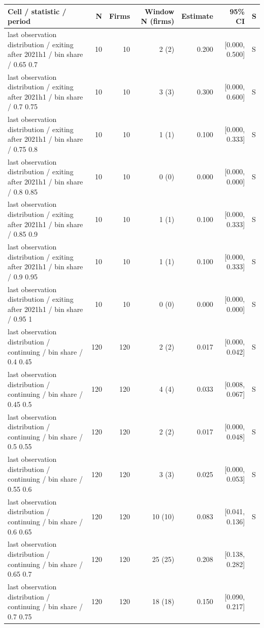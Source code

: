 \begin{threeparttable}
\begin{tabular}{p{5.7cm}rrrrrl}
\toprule
Cell / statistic / period & N & Firms & Window N (firms) & Estimate & 95\% CI & S \\
\midrule
last observation distribution / exiting after 2021h1 / bin share / 0.65 0.7 & 10 & 10 & 2 (2) & 0.200 & [0.000, 0.500] & S \\
last observation distribution / exiting after 2021h1 / bin share / 0.7 0.75 & 10 & 10 & 3 (3) & 0.300 & [0.000, 0.600] & S \\
last observation distribution / exiting after 2021h1 / bin share / 0.75 0.8 & 10 & 10 & 1 (1) & 0.100 & [0.000, 0.333] & S \\
last observation distribution / exiting after 2021h1 / bin share / 0.8 0.85 & 10 & 10 & 0 (0) & 0.000 & [0.000, 0.000] & S \\
last observation distribution / exiting after 2021h1 / bin share / 0.85 0.9 & 10 & 10 & 1 (1) & 0.100 & [0.000, 0.333] & S \\
last observation distribution / exiting after 2021h1 / bin share / 0.9 0.95 & 10 & 10 & 1 (1) & 0.100 & [0.000, 0.333] & S \\
last observation distribution / exiting after 2021h1 / bin share / 0.95 1 & 10 & 10 & 0 (0) & 0.000 & [0.000, 0.000] & S \\
last observation distribution / continuing / bin share / 0.4 0.45 & 120 & 120 & 2 (2) & 0.017 & [0.000, 0.042] & S \\
last observation distribution / continuing / bin share / 0.45 0.5 & 120 & 120 & 4 (4) & 0.033 & [0.008, 0.067] & S \\
last observation distribution / continuing / bin share / 0.5 0.55 & 120 & 120 & 2 (2) & 0.017 & [0.000, 0.048] & S \\
last observation distribution / continuing / bin share / 0.55 0.6 & 120 & 120 & 3 (3) & 0.025 & [0.000, 0.053] & S \\
last observation distribution / continuing / bin share / 0.6 0.65 & 120 & 120 & 10 (10) & 0.083 & [0.041, 0.136] & S \\
last observation distribution / continuing / bin share / 0.65 0.7 & 120 & 120 & 25 (25) & 0.208 & [0.138, 0.282] &  \\
last observation distribution / continuing / bin share / 0.7 0.75 & 120 & 120 & 18 (18) & 0.150 & [0.090, 0.217] &  \\
\bottomrule
\end{tabular}

\end{threeparttable}
